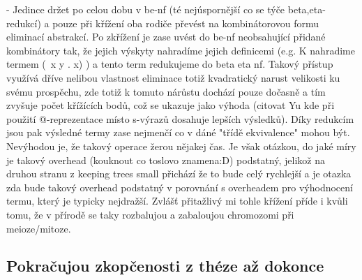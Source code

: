 \documentclass{sig-alternate}
\begin{document}
{- Jedince držet po celou dobu v be-nf (té nejúspornější co se týče 
  beta,eta-redukcí) a pouze při křížení oba rodiče převést na kombinátorovou formu
  eliminací abstrakcí. Po zkřížení je zase uvést do be-nf neobsahující přidané kombinátory tak, že jejich výskyty nahradíme jejich definicemi 
  (e.g. K nahradime termem (\ x y . x) ) a tento term redukujeme 
  do beta eta nf. Takový přístup využívá dříve nelibou vlastnost eliminace totiž kvadratický narust velikosti ku svému prospěchu, zde totiž k tomuto nárůstu dochází pouze dočasně a tím zvyšuje počet křížících bodů, což se ukazuje jako výhoda (citovat Yu kde při použití @-reprezentace místo s-výrazů dosahuje lepších výsledků). Díky redukcím jsou pak výsledné termy zase nejmenčí co v dáné "třídě ekvivalence" mohou být. Nevýhodou je, že takový operace žerou nějakej čas. Je však otázkou, do jaké míry je takový overhead (kouknout co toslovo znamena:D) podstatný, jelikož na druhou stranu 
  z keeping trees small přichází že to bude celý rychlejší a je otazka zda bude takový overhead podstatný v porovnání s overheadem pro výhodnocení termu, který je typicky nejdražší. Zvlášť přitažlivý mi tohle křížení příde i kvůli tomu, že v přírodě se taky rozbalujou a zabaloujou chromozomi při meioze/mitoze.
  
  

}

\subsection{Pokračujou zkopčenosti z théze až dokonce }
\end{document}
